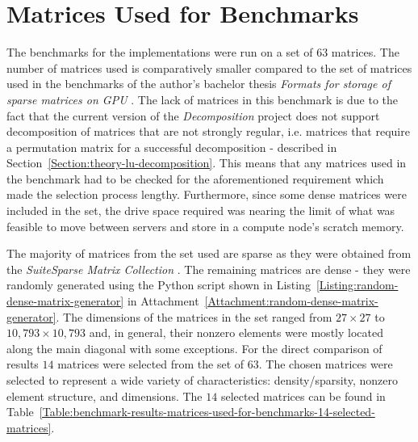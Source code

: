 \section{Matrices Used for Benchmarks \TO}
The benchmarks for the implementations were run on a set of $ 63 $ matrices. The number of matrices used is comparatively smaller compared to the set of matrices used in the benchmarks of the author's bachelor thesis \textit{Formats for storage of sparse matrices on GPU} \cite{Cejka2020}. The lack of matrices in this benchmark is due to the fact that the current version of the \textit{Decomposition} project does not support decomposition of matrices that are not strongly regular, i.e. matrices that require a permutation matrix for a successful decomposition - described in Section~\ref{Section:theory-lu-decomposition}. This means that any matrices used in the benchmark had to be checked for the aforementioned requirement which made the selection process lengthy. Furthermore, since some dense matrices were included in the set, the drive space required was nearing the limit of what was feasible to move between servers and store in a compute node's scratch memory.
\par The majority of matrices from the set used are sparse as they were obtained from the \emph{SuiteSparse Matrix Collection} \cite{Davis2011}. The remaining matrices are dense - they were randomly generated using the Python script shown in Listing~\ref{Listing:random-dense-matrix-generator} in Attachment~\ref{Attachment:random-dense-matrix-generator}. The dimensions of the matrices in the set ranged from $ 27 \times 27 $ to $ 10,793 \times 10,793 $ and, in general, their nonzero elements were mostly located along the main diagonal with some exceptions. For the direct comparison of results $ 14 $ matrices were selected from the set of $ 63 $. The chosen matrices were selected to represent a wide variety of characteristics: density/sparsity, nonzero element structure, and dimensions. The $ 14 $ selected matrices can be found in Table~\ref{Table:benchmark-results-matrices-used-for-benchmarks-14-selected-matrices}.

